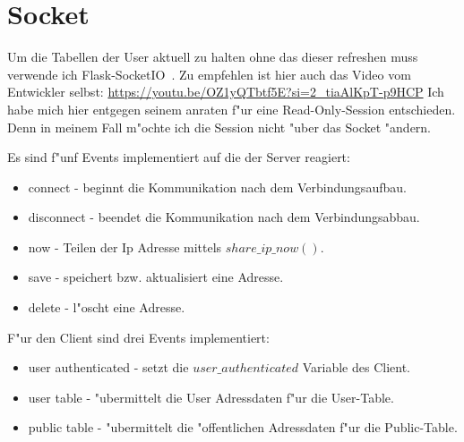 \section{Socket}\label{sec:socket}
Um die Tabellen der User aktuell zu halten ohne das dieser refreshen muss verwende ich Flask-SocketIO~\cite{socket}.
Zu empfehlen ist hier auch das Video vom Entwickler selbst: \url{https://youtu.be/OZ1yQTbtf5E?si=2_tiaAlKpT-p9HCP}
Ich habe mich hier entgegen seinem anraten f{"u}r eine Read-Only-Session entschieden.
Denn in meinem Fall m{"o}chte ich die Session nicht {"u}ber das Socket {"a}ndern.
\begin{samepage}
    Es sind f{"u}nf Events implementiert auf die der Server reagiert:
    \begin{itemize}
        \setlength\itemsep{-0.4em}
        \item connect - beginnt die Kommunikation nach dem Verbindungsaufbau.
        \item disconnect - beendet die Kommunikation nach dem Verbindungsabbau.
        \item now - Teilen der Ip Adresse mittels $share\_ip\_now()$.
        \item save - speichert bzw. aktualisiert eine Adresse.
        \item delete - l{"o}scht eine Adresse.
    \end{itemize}
\end{samepage}

\begin{samepage}
    F{"u}r den Client sind drei Events implementiert:
    \begin{itemize}
        \setlength\itemsep{-0.4em}
        \item user authenticated - setzt die $user\_authenticated$ Variable des Client.
        \item user table - {"u}bermittelt die User Adressdaten f{"u}r die User-Table.
        \item public table - {"u}bermittelt die {"o}ffentlichen Adressdaten f{"u}r die Public-Table.
    \end{itemize}
\end{samepage}


